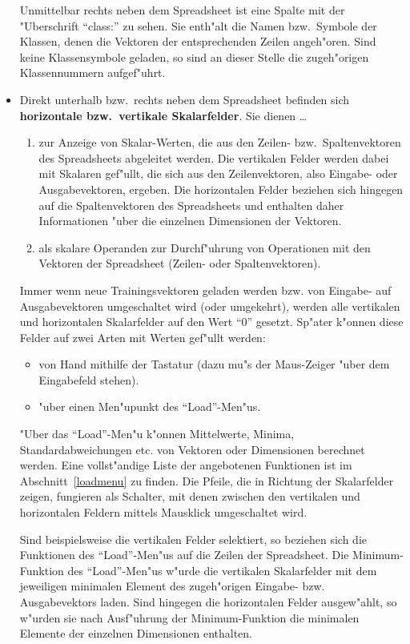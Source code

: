 \begin{itemize}
\begin{sloppypar}
Unmittelbar rechts neben dem Spreadsheet ist eine Spalte mit der
"Uberschrift "`class:"' zu sehen.
Sie enth"alt die Namen bzw.~Symbole der Klassen, denen die Vektoren
der entsprechenden Zeilen angeh"oren.
Sind keine Klassensymbole geladen, so sind an dieser Stelle die
zugeh"origen Klassennummern aufgef"uhrt. 
\end{sloppypar}

\item Direkt unterhalb bzw.~rechts neben dem Spreadsheet befinden sich 
{\bf horizontale bzw.~vertikale Skalarfelder}.
Sie dienen \ldots

\begin{enumerate}
\item zur Anzeige von Skalar-Werten, die aus den Zeilen-
bzw.~Spaltenvektoren des Spreadsheets abgeleitet werden.
Die vertikalen Felder werden dabei mit Skalaren gef"ullt, die
sich aus den Zeilenvektoren, also Eingabe- oder Ausgabevektoren,
ergeben.
Die horizontalen Felder beziehen sich hingegen auf die Spaltenvektoren
des Spreadsheets und enthalten daher Informationen "uber die einzelnen
Dimensionen der Vektoren.
\item als skalare Operanden zur Durchf"uhrung von Operationen
mit den Vektoren der Spreadsheet (Zeilen- oder Spaltenvektoren).
\end{enumerate}

Immer wenn neue Trainingsvektoren geladen werden bzw. von Eingabe- auf
Ausgabevektoren umgeschaltet wird (oder umgekehrt), werden alle 
vertikalen und horizontalen Skalarfelder auf den Wert "`0"' gesetzt.
Sp"ater k"onnen diese Felder auf zwei Arten mit Werten gef"ullt werden:

\begin{itemize}
\item von Hand mithilfe der Tastatur (dazu mu"s der Maus-Zeiger "uber
dem Eingabefeld stehen).
\item "uber einen Men"upunkt des "`Load"'-Men"us.
\end{itemize}

"Uber das "`Load"'-Men"u k"onnen Mittelwerte, Minima, Standardabweichungen
etc. von Vektoren oder Dimensionen berechnet werden.
Eine vollst"andige Liste der angebotenen Funktionen ist im
Abschnitt~\ref{loadmenu} zu finden.
Die Pfeile, die in Richtung der Skalarfelder zeigen, fungieren als
Schalter, mit denen zwischen den vertikalen und horizontalen Feldern
mittels Mausklick umgeschaltet wird.

Sind beispielsweise die vertikalen Felder selektiert, so beziehen sich
die Funktionen des "`Load"'-Men"us auf die Zeilen der Spreadsheet.
Die Minimum-Funktion des "`Load"'-Men"us w"urde die vertikalen Skalarfelder
mit dem jeweiligen minimalen Element des zugeh"origen Eingabe- bzw.
Ausgabevektors laden. 
Sind hingegen die horizontalen Felder ausgew"ahlt, so w"urden sie 
nach Ausf"uhrung der Minimum-Funktion die minimalen Elemente der einzelnen 
Dimensionen enthalten.


\end{itemize}
